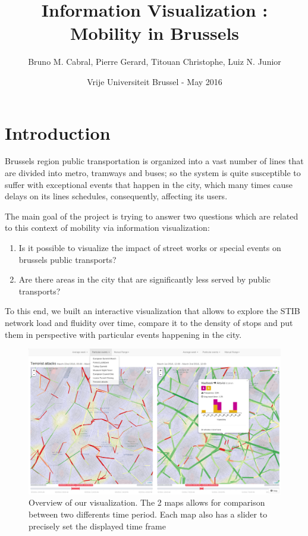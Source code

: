 \documentclass[11pt]{article}%
\begin{document}
\title{Information Visualization : Mobility in Brussels}
\author{Bruno M. Cabral, Pierre Gerard, Titouan Christophe, Luiz N. Junior}
\date{Vrije Universiteit Brussel - May 2016}
\maketitle


\section{Introduction}

Brussels region public transportation is organized into a vast number of lines that are divided into metro, tramways and buses; so the system is quite susceptible to suffer with exceptional events that happen in the city, which many times cause delays on its lines schedules, consequently, affecting its users.


The main goal of the project is trying to answer two questions which are related to this context of mobility via information visualization:

\begin{enumerate}
	\item Is it possible to visualize the impact of street works or special events on brussels public transports?
	\item Are there areas in the city that are significantly less served by public transports?
\end{enumerate}

To this end, we built an interactive visualization that allows to explore the STIB network load and fluidity over time, compare it to the density of stops and put them in perspective with particular events happening in the city.

\begin{figure}[H]
    \includegraphics[width=\textwidth]{images/comparison.png}
    \caption{Overview of our visualization. The 2 maps allows for comparison between two differents time period. Each map also has a slider to precisely set the displayed time frame}
  \end{figure}
\end{document}
